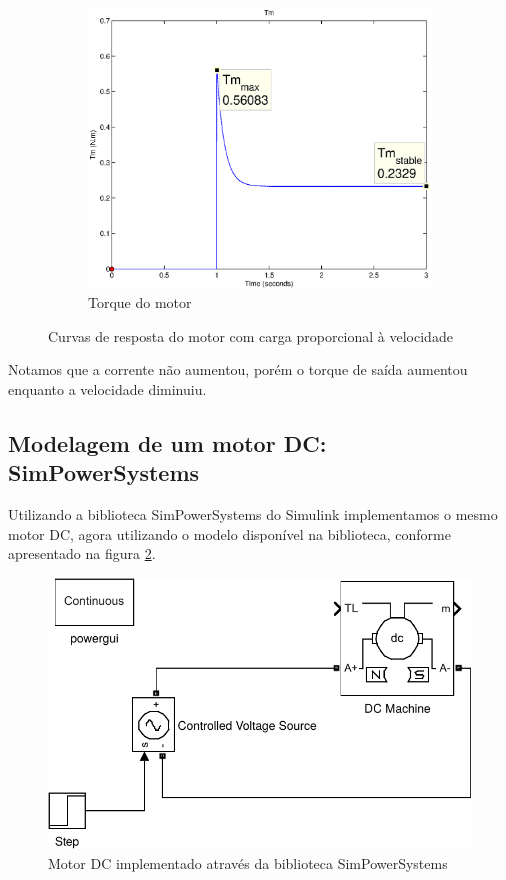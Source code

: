 \documentclass{article}
\begin{document}
\begin{figure}[H]
\begin{subfigure}[b]{0.49\linewidth}
		\centering
		\includegraphics[width=\linewidth]{matlab/tm2}
		\caption{Torque do motor}
	\end{subfigure}
	\caption{Curvas de resposta do motor com carga proporcional à velocidade}
	\label{fig:res2}
\end{figure}

Notamos que a corrente não aumentou, porém o torque de saída aumentou enquanto a velocidade diminuiu.

\subsection{Modelagem de um motor DC: SimPowerSystems}
Utilizando a biblioteca SimPowerSystems do Simulink implementamos o mesmo motor DC, agora utilizando o modelo disponível na biblioteca, conforme apresentado na figura \ref{fig:sim2}.
\begin{figure}[H]
	\centering
	\includegraphics[width=0.6\linewidth]{matlab/sim2}
	\caption{Motor DC implementado através da biblioteca SimPowerSystems}
	\label{fig:sim2}
\end{figure}
\end{document}

